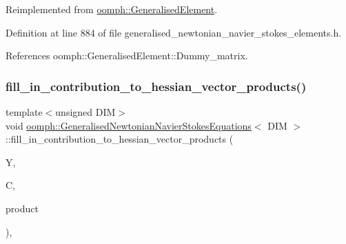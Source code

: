 Reimplemented from \hyperlink{classoomph_1_1GeneralisedElement_a64d31806fcbe7c5b689a3281932e8073}{oomph\+::\+Generalised\+Element}.



Definition at line 884 of file generalised\+\_\+newtonian\+\_\+navier\+\_\+stokes\+\_\+elements.\+h.



References oomph\+::\+Generalised\+Element\+::\+Dummy\+\_\+matrix.

\mbox{\label{classoomph_1_1GeneralisedNewtonianNavierStokesEquations_af994107ca05228c14a8e63ae8793f4c3}} 
\subsubsection{\texorpdfstring{fill\+\_\+in\+\_\+contribution\+\_\+to\+\_\+hessian\+\_\+vector\+\_\+products()}{fill\_in\_contribution\_to\_hessian\_vector\_products()}}
{\footnotesize\ttfamily template$<$unsigned D\+IM$>$ \\
void \hyperlink{classoomph_1_1GeneralisedNewtonianNavierStokesEquations}{oomph\+::\+Generalised\+Newtonian\+Navier\+Stokes\+Equations}$<$ D\+IM $>$\+::fill\+\_\+in\+\_\+contribution\+\_\+to\+\_\+hessian\+\_\+vector\+\_\+products (\begin{DoxyParamCaption}\item[{\hyperlink{classoomph_1_1Vector}{Vector}$<$ double $>$ const \&}]{Y,  }\item[{\hyperlink{classoomph_1_1DenseMatrix}{Dense\+Matrix}$<$ double $>$ const \&}]{C,  }\item[{\hyperlink{classoomph_1_1DenseMatrix}{Dense\+Matrix}$<$ double $>$ \&}]{product }\end{DoxyParamCaption})\hspace{0.3cm}{\ttfamily [protected]}, {\ttfamily [virtual]}}



